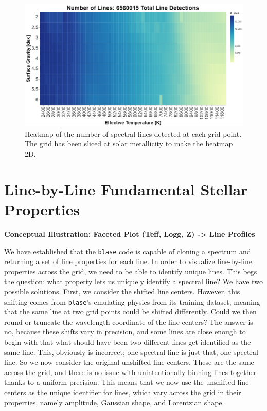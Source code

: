 \documentclass[twocolumn]{aastex631}
\begin{document}
\begin{figure}
    \includegraphics[width=\textwidth]{images/line_density.png}
    \caption{Heatmap of the number of spectral lines detected at each grid point.
    The grid has been sliced at solar metallicity to make the heatmap 2D.}
\end{figure}

\section{Line-by-Line Fundamental Stellar Properties}
\begin{mdframed}
    \textbf{Conceptual Illustration: Faceted Plot (Teff, Logg, Z) -> Line Profiles}
\end{mdframed}

We have established that the \texttt{blase} code is capable of cloning a spectrum and
returning a set of line properties for each line. In order to visualize line-by-line
properties across the grid, we need to be able to identify unique lines. This begs the question:
what property lets us uniquely identify a spectral line? We have two possible solutions.
First, we consider the shifted line centers. However, this shifting comes from \texttt{blase}'s
emulating physics from its training dataset, meaning that the same line at two grid points could
be shifted differently. Could we then round or truncate the wavelength coordinate of the line centers?
The answer is no, because these shifts vary in precision, and some lines are close enough to begin with
that what should have been two different lines get identified as the same line. This, obviously is incorrect;
one spectral line is just that, one spectral line. So we now consider the original unshifted line centers.
These are the same across the grid, and there is no issue with unintentionally binning lines together
thanks to a uniform precision. This means that we now use the unshifted line centers as the unique
identifier for lines, which vary across the grid in their properties, namely amplitude, Gaussian shape,
and Lorentzian shape.
\end{document}
